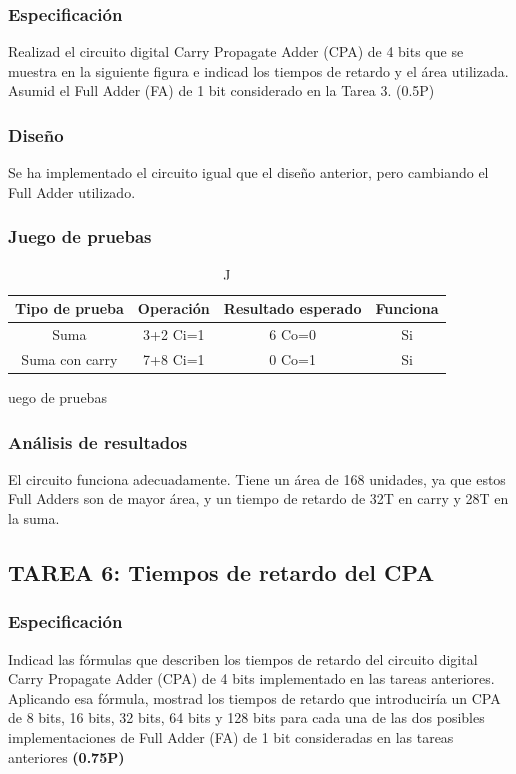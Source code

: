 \documentclass{article}
\begin{document}
		\subsubsection*{Especificación}
		Realizad el circuito digital Carry Propagate Adder (CPA) de 4 bits que se muestra en la siguiente figura e indicad los tiempos de retardo y el área utilizada.
		Asumid el Full Adder (FA) de 1 bit considerado en la Tarea 3. (0.5P)


		\subsubsection*{Diseño}
		Se ha implementado el circuito igual que el diseño anterior, pero cambiando el Full Adder utilizado.


		\subsubsection*{Juego de pruebas}
		\begin{table}[h]
			\begin{center}
				\begin{tabular}{| c | c | c | c |}
					\hline
					Tipo de prueba & Operación & Resultado esperado & Funciona \\ \hline
						
					Suma & 3+2 Ci=1 & 6 Co=0 & Si \\ \hline
					Suma con carry & 7+8 Ci=1 & 0 Co=1 & Si \\ \hline
	
				\end{tabular}
				\caption Juego de pruebas
			\end{center}
		\end{table}



		\subsubsection*{Análisis de resultados}
		El circuito funciona adecuadamente. Tiene un área de 168 unidades, ya que estos Full Adders son de mayor área, y un tiempo de retardo de 32T en carry y 28T en la suma.
	\subsection{TAREA 6: Tiempos de retardo del CPA}
		\subsubsection*{Especificación}
		Indicad las fórmulas que describen los tiempos de retardo del circuito digital Carry Propagate Adder (CPA) de 4 bits implementado en las tareas anteriores.
		Aplicando esa fórmula, mostrad los tiempos de retardo que introduciría un CPA de 8 bits, 16 bits, 32 bits, 64 bits y 128 bits para cada una de las dos posibles implementaciones de Full Adder (FA) de 1 bit consideradas en las tareas anteriores \textbf{(0.75P)}
\end{document}
